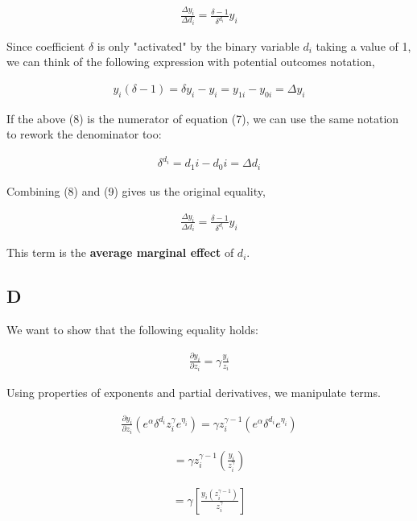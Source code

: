 \documentclass{article}
\begin{document}
\begin{align}
    \frac{\Delta y_i}{\Delta {d_i}}  = \frac{\delta - 1}{\delta ^ {d_i}} y_i
\end{align}

Since coefficient $\delta$ is only "activated" by the binary variable $d_i$ taking a value of 1, we can think of the following expression with potential outcomes notation,

\begin{align}
    y_i (\delta - 1) = \delta y_i - y_i = y_{1i} - y_{0i} = \Delta y_i
\end{align}

If the above (8) is the numerator of equation (7), we can use the same notation to rework the denominator too:

\begin{align}
    \delta^{d_i} = d_1i - d_0i = \Delta d_i
\end{align}

Combining (8) and (9) gives us the original equality,

\begin{align}
    \frac{\Delta y_i}{\Delta {d_i}}  = \frac{\delta - 1}{\delta ^ {d_i}} y_i
\end{align}

This term is the \textbf{average marginal effect} of $d_i$.

\subsection{D}

We want to show that the following equality holds:

\begin{align}
    \frac{\partial y_i}{\partial z_i} = \gamma \frac{y_i}{z_i}
\end{align}

Using properties of exponents and partial derivatives, we manipulate terms.

\begin{align}
    \frac{\partial y_i}{\partial z_i} \left(e^\alpha \delta^{d_i} z^\gamma_i e^{\eta_i}\right) = \gamma z_i ^ {\gamma - 1} \left(e^\alpha \delta^{d_i}e^{\eta_i}\right)
\end{align}

\begin{align}
    = \gamma z_i ^{\gamma - 1} \left(\frac{y_i}{z_i^\gamma} \right)
\end{align}

\begin{align}
    = \gamma \left[\frac{y_i (z_i ^{\gamma - 1})}{z_i^\gamma} \right]
\end{align}
\end{document}
